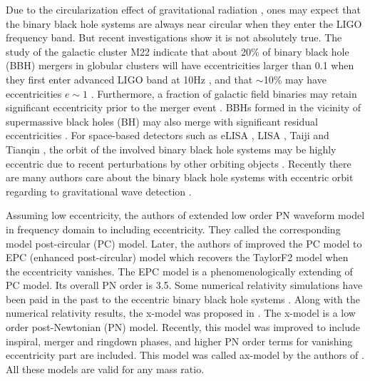 \documentclass[prd,aps,a4paper,superscriptaddress,twocolumn,footinbib,showpacs]{revtex4}
\begin{document}
Due to the circularization effect of gravitational radiation \cite{PhysRev.136.B1224}, ones may expect that the binary black hole systems are always near circular when they enter the LIGO frequency band. But recent investigations show it is not absolutely true. The study of the galactic cluster M22 indicate that about 20\% of binary black hole (BBH) mergers in globular clusters will have eccentricities larger than 0.1 when they first enter advanced LIGO band at 10Hz \cite{strader2012two}, and that $\sim$10\% may have eccentricities $e\sim1$ \cite{antonini2016black}. Furthermore, a fraction of galactic field binaries may retain significant eccentricity prior to the merger event \cite{samsing2014formation}. BBHs formed in the vicinity of supermassive black holes (BH) may also merge with significant residual eccentricities \cite{vanlandingham2016role}. For space-based detectors such as eLISA \cite{amaro2012low}, LISA \cite{bender1998lisa,audley2017laser}, Taiji \cite{gong2011scientific} and Tianqin \cite{luo2016tianqin}, the orbit of the involved binary black hole systems may be highly eccentric due to recent perturbations by other orbiting objects \cite{hils1995gradual,PhysRevD.50.6297}. Recently there are many authors care about the binary black hole systems with eccentric orbit regarding to gravitational wave detection \cite{PhysRevD.80.084001,PhysRevD.90.084016,PhysRevD.92.044034,PhysRevD.95.024038}.

Assuming low eccentricity, the authors of \cite{PhysRevD.80.084001} extended low order PN waveform model in frequency domain to including eccentricity. They called the corresponding model post-circular (PC) model. Later, the authors of \cite{PhysRevD.90.084016} improved the PC model to EPC (enhanced post-circular) model which recovers the TaylorF2 model when the eccentricity vanishes. The EPC model is a phenomenologically extending of PC model. Its overall PN order is 3.5. Some numerical relativity simulations have been paid in the past to the eccentric binary black hole systems \cite{PhysRevD.78.064069,PhysRevD.82.024033,PhysRevD.88.064051}. Along with the numerical relativity results, the x-model was proposed in \cite{PhysRevD.82.024033}. The x-model is a low order post-Newtonian (PN) model. Recently, this model was improved to include inspiral, merger and ringdown phases, and higher PN order terms for vanishing eccentricity part are included. This model was called ax-model by the authors of \cite{PhysRevD.95.024038}. All these models are valid for any mass ratio.
\end{document}
